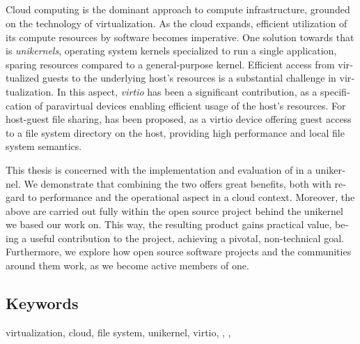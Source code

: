 \begin{otherlanguage}{english}
	\chapter*{\abstractname}
	Cloud computing is the dominant approach to compute infrastructure, grounded
	on the technology of virtualization. As the cloud expands, efficient
	utilization of its compute resources by software becomes imperative. One
	solution towards that is \emph{unikernels}, operating system
	kernels specialized to run a single application, sparing resources compared
	to a general-purpose kernel. Efficient access from virtualized guests to the
	underlying host's resources is a substantial challenge in virtualization.
	In this aspect, \emph{virtio} has been a significant contribution, as a
	specification of paravirtual devices enabling efficient usage of the host's
	resources. For host-guest file sharing, \emph{\viofs{}} has been proposed,
	as a virtio device offering guest access to a file system directory on the
	host, providing high performance and local file system semantics.

	This thesis is concerned with the implementation and evaluation of \viofs{}
	in a unikernel. We demonstrate that combining the two offers great benefits,
	both with regard to performance and the operational aspect in a cloud
	context. Moreover, the above are carried out fully within the open source
	project behind the unikernel we based our work on. This way, the resulting
	product gains practical value, being a useful contribution to the project,
	achieving a pivotal, non-technical goal. Furthermore, we explore how open
	source software projects and the communities around them work, as we become
	active members of one.

	\section*{Keywords}
	\noindent
	virtualization, cloud, file system, unikernel, virtio, \osv{}, \viofs{},
	\qemu{}
\end{otherlanguage}
